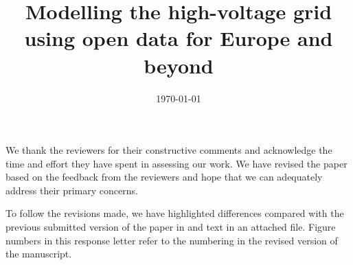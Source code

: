 \documentclass{response}
\title{Modelling the high-voltage grid using open data for Europe and beyond}
\date{\today}
\begin{document}
 

\maketitle 

We thank the reviewers for their constructive comments and acknowledge the time
and effort they have spent in assessing our work. We have revised the paper
based on the feedback from the reviewers and hope that we can adequately address
their primary concerns.

To follow the revisions made, we have highlighted differences compared with the
previous submitted version of the paper in {\color{blue}{blue}} and
{\color{red}{red}} text in an attached file. Figure numbers in this response letter
refer to the numbering in the revised version of the manuscript.
\end{document}
